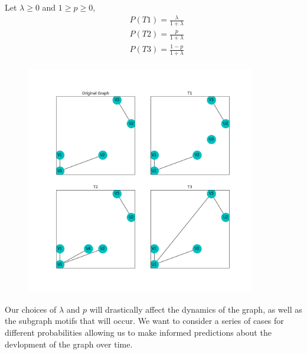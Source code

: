 Let $\lambda \geq 0$ and $1 \geq p \geq 0$,
\begin{align*}
    &P(T1) = \frac{\lambda}{1 + \lambda} \\
    &P(T2) = \frac{p}{1 + \lambda} \\
    &P(T3) = \frac{1-p}{1 + \lambda} \\
\end{align*}


\begin{figure}
    \includegraphics[width=10cm]{Images/events.png}\
    \centering
\end{figure}
\vspace{3mm}

Our choices of $\lambda$ and $p$ will drastically affect the dynamics of the graph, as well as the subgraph motifs that will
occur. We want to consider a series of cases for different probabilities allowing us to make informed predictions about the devlopment
of the graph over time.

